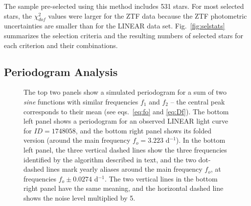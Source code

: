 The sample pre-selected using this method includes 531 stars. For most selected stars, the $\chi^2_{dof}$ values were
larger for the ZTF data because the ZTF photometric uncertainties are smaller than for the LINEAR data set. 
Fig.~\ref{fig:selstats} summarizes the selection criteria and the resulting numbers of selected stars for each
criterion and their combinations. 
 


\subsection{Periodogram Analysis} 


\begin{figure}[ht]
  \centering
  \caption{The top two panels show a simulated periodogram for a sum of two {\it sine} functions with similar frequencies
    $f_1$ and  $f_2$ --   the central peak corresponds to their mean (see eqs.~\ref{eq:fo} and \ref{eq:Df}).
    The bottom left panel shows a periodogram for an observed LINEAR light curve for $ID=1748058$, and the bottom right panel shows its
    folded version (around the main frequency $f_o=3.223$ d$^{-1}$). In the bottom left panel, the three vertical dashed
    lines show the three  frequencies identified by the algorithm described in text, and the two dot-dashed lines mark
    yearly aliases around the main frequency $f_o$, at frequencies $f_o \pm 0.0274$ d$^{-1}$. The two vertical lines in the
    bottom right panel have the same meaning, and the horizontal dashed line shows the noise level multiplied by 5.}
\label{fig:periodogram}
\end{figure}

